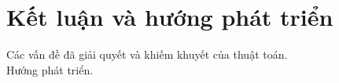 \chapter{Kết luận và hướng phát triển}
\label{Chapter5}
\hspace{10mm}Các vấn đề đã giải quyết và khiếm khuyết của thuật toán.\\
\hspace*{10mm}Hướng phát triển.\\